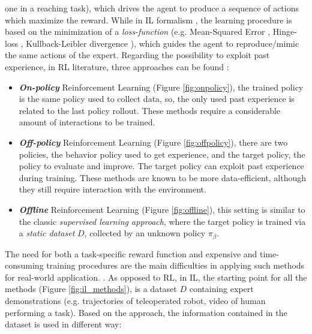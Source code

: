 one in a reaching task), which drives the agent to produce a sequence of actions which maximize the reward.
While in IL formalism \cite{osa2018algorithmic}, the learning procedure is based on the minimization of a
\textit{loss-function} (e.g. Mean-Squared Error \cite{james2013introduction_to_sl}, Hinge-loss \cite{cortes1995support},
Kullback-Leibler divergence \cite{kullback1951information}), which guides the agent to reproduce/mimic the same actions
of the expert. \newline Regarding the possibility to exploit past experience, in RL literature, three approaches can be
found \cite{levine202rl_tutorial}:
\begin{itemize}
    \item \textbf{\textit{On-policy}} Reinforcement Learning (Figure \ref{fig:onpolicy}), the trained policy is the same
    policy used to collect data, so, the only used past experience is related to the last policy rollout. These methods
    require a considerable amount of interactions to be trained.
    \item \textbf{\textit{Off-policy}} Reinforcement Learning (Figure \ref{fig:offpolicy}), there are two policies, the
    behavior policy used to get experience, and the target policy, the policy to evaluate and improve. The target policy
    can exploit past experience during training. These methods are known to be more data-efficient, although
    they still require interaction with the environment.
    \item \textbf{\textit{Offline}} Reinforcement Learning (Figure \ref{fig:offline}), this setting is similar to the
    classic \textit{supervised learning approach}, where the target policy is trained via a \textit{static dataset} $D$,
    collected by an unknown policy $\pi_{\beta}$.  
\end{itemize}

\noindent The need for both a task-specific reward function and expensive and time-consuming training procedures are the main difficulties in applying such methods for real-world application.
\cite{hussein2017imitation_learning_survey}. \newline As opposed to RL, in IL, the starting point for all the methods
(Figure \ref{fig:il_methods}), is a dataset $D$ containing expert demonstrations (e.g. trajectories of teleoperated
robot, video of human performing a task). Based on the approach, the information contained in the dataset
is used in different way:
